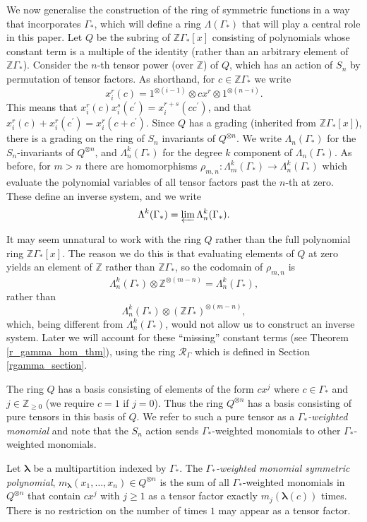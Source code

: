 \documentclass[ALCO,Unicode]{cedram}
\newcommand{\bs}{\boldsymbol}
\newcommand{\RGamma}{\mathcal{R}_{\Gamma}}
\newcommand{\LambdaG}{\Lambda(\Gamma_*)}
\newcommand{\RGamma}{\mathcal{R}_{\Gamma}}
\newcommand{\LambdaG}{\Lambda(\Gamma_*)}
\begin{document}
We now generalise the construction of the ring of symmetric functions in a way that incorporates $\Gamma_*$, which will define a ring $\LambdaG$ that will play a central role in this paper. Let $Q$ be the subring of $\mathbb{Z}\Gamma_*[x]$ consisting of polynomials whose constant term is a multiple of the identity (rather than an arbitrary element of $\mathbb{Z}\Gamma_*$). Consider the $n$-th tensor power (over $\mathbb{Z}$) of $Q$, which has an action of $S_n$ by permutation of tensor factors. As shorthand, for $c \in \mathbb{Z}\Gamma_*$ we write 
\[
x_i^r(c) = 1^{\otimes (i-1)} \otimes cx^r \otimes 1^{\otimes (n-i)}.
\]
This means that $x_i^r(c) x_i^s(c^\prime) = x_i^{r+s}(cc^\prime)$, and that $x_i^r(c) + x_i^r(c^\prime) = x_i^r(c+c^\prime)$. Since $Q$ has a grading (inherited from $\mathbb{Z}\Gamma_*[x]$), there is a grading on the ring of $S_n$ invariants of $Q^{\otimes n}$. We write $\Lambda_n(\Gamma_*)$ for the $S_n$-invariants of $Q^{\otimes n}$, and $\Lambda_n^k(\Gamma_*)$ for the degree $k$ component of $\Lambda_n(\Gamma_*)$. As before, for $m>n$ there are homomorphisms $\rho_{m,n}: \Lambda_{m}^k(\Gamma_*) \to \Lambda_{n}^k(\Gamma_*)$ which evaluate the polynomial variables of all tensor factors past the $n$-th at zero. These define an inverse system, and we write
\[
\Lambda^k(\Gamma_*) = \varprojlim \Lambda_n^k(\Gamma_*).
\]
\begin{remark}
It may seem unnatural to work with the ring $Q$ rather than the full polynomial ring $\mathbb{Z}\Gamma_*[x]$. The reason we do this is that evaluating elements of $Q$ at zero yields an element of $\mathbb{Z}$ rather than $\mathbb{Z}\Gamma_*$, so the codomain of $\rho_{m,n}$ is
\[
\Lambda_n^k(\Gamma_*) \otimes \mathbb{Z}^{\otimes (m-n)} = \Lambda_n^k(\Gamma_*),
\]
rather than
\[
\Lambda_n^k(\Gamma_*) \otimes (\mathbb{Z}\Gamma_*)^{\otimes (m-n)},
\]
which, being different from $\Lambda_n^k(\Gamma_*)$, would not allow us to construct an inverse system. Later we will account for these ``missing'' constant terms (see Theorem \ref{r_gamma_hom_thm}), using the ring $\RGamma$ which is defined in Section \ref{rgamma_section}.
\end{remark}

The ring $Q$ has a basis consisting of elements of the form $c x^j$ where $c \in \Gamma_*$ and $j \in \mathbb{Z}_{\geq 0}$ (we require $c = 1$ if $j=0$). Thus the ring $Q^{\otimes n}$ has a basis consisting of pure tensors in this basis of $Q$. We refer to such a pure tensor as a \emph{$\Gamma_*$-weighted monomial} and note that the $S_n$ action sends $\Gamma_*$-weighted monomials to other $\Gamma_*$-weighted monomials.
\begin{definition}
Let $\bs \lambda$ be a multipartition indexed by $\Gamma_*$. The \emph{$\Gamma_*$-weighted monomial symmetric polynomial}, $m_{\bs \lambda}(x_1, \ldots, x_n) \in Q^{\otimes n}$ is the sum of all $\Gamma_*$-weighted monomials in $Q^{\otimes n}$ that contain $c x^j$ with $j \geq 1$ as a tensor factor exactly $m_j(\bs \lambda(c))$ times. There is no restriction on the number of times $1$ may appear as a tensor factor.
\end{definition}
\end{document}
